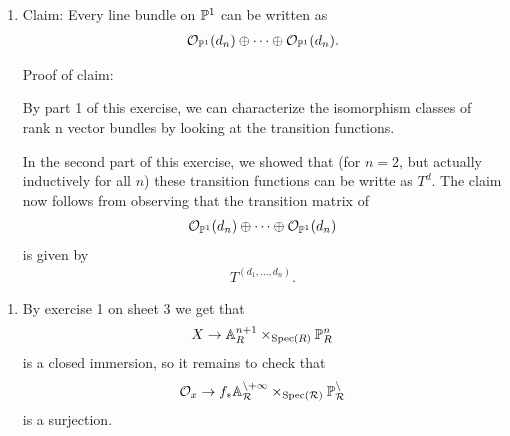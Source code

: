 \begin{exercise}{2}
\begin{enumerate}
    \item[3.]{
        Claim: Every line bundle on $\mathbb{P}^1$ can be written as 
        \begin{align*}
            \mathcal{O}_{\mathbb{P}^1}(d_n)\oplus \dots \oplus \mathcal{O}_{\mathbb{P} ^1}(d_n).
        \end{align*}
        
        Proof of claim:

        By part 1 of this exercise, we can characterize the isomorphism classes of rank n vector bundles by looking at the transition functions. 

        In the second part of this exercise, we showed that (for $n=2$, but actually inductively for all $n$) these 
        transition functions can be writte as $T^d$. The claim now follows from observing that the transition matrix of 
        \begin{align*}
            \mathcal{O}_{\mathbb{P}^1}(d_n)\oplus \dots \oplus \mathcal{O}_{\mathbb{P} ^1}(d_n)
        \end{align*}
        is given by
        \begin{align*}
            T^{(d_1,\dots, d_n)}.
        \end{align*}
    }
    \end{enumerate}
\end{exercise}

\begin{exercise}{3}
    \begin{enumerate}
        \item By exercise 1 on sheet 3 we get that 
        \begin{align*}
            X \to \mathbb{A}_R^{n+1} \times_{\operatorname{Spec}(R)} \mathbb{P}^n_R
        \end{align*}
        is a closed immersion, so it remains to check that 
        \begin{align*}
            \mathcal{O}_x \to f_* \mathcal{\mathbb{A}_R^{n+1} \times_{\operatorname{Spec}(R)} \mathbb{P}^n_R}
        \end{align*}
        is a surjection.
    \end{enumerate}
\end{exercise}

